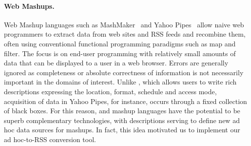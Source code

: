 
\paragraph*{Web Mashups.}
Web Mashup languages such as MashMaker~\cite{ennals+:mashmaker} 
and Yahoo Pipes~\cite{yahoopipes} allow naive web programmers to
extract data from web sites and RSS feeds and recombine them,
often using conventional functional programming paradigms such as
map and filter.  The focus is on end-user programming with relatively
small amounts of data that can be displayed to a user in a web
browser. Errors are generally ignored as completeness or absolute 
correctness
of information is not necessarily important in the domains of interest.
Unlike \padsd{}, which allows users to write rich descriptions
expressing the location, format, schedule and access mode, acquisition of 
data in Yahoo Pipes, for instance, occurs through a fixed collection of 
black boxes.  For this reason, \padsd{} and mashup languages have the 
potential to be superb complementary technologies, with \padsd{} descriptions
serving to define new ad hoc data sources for mashups.  In fact, this
idea motivated us to implement our \padsd{} ad hoc-to-RSS conversion tool.


